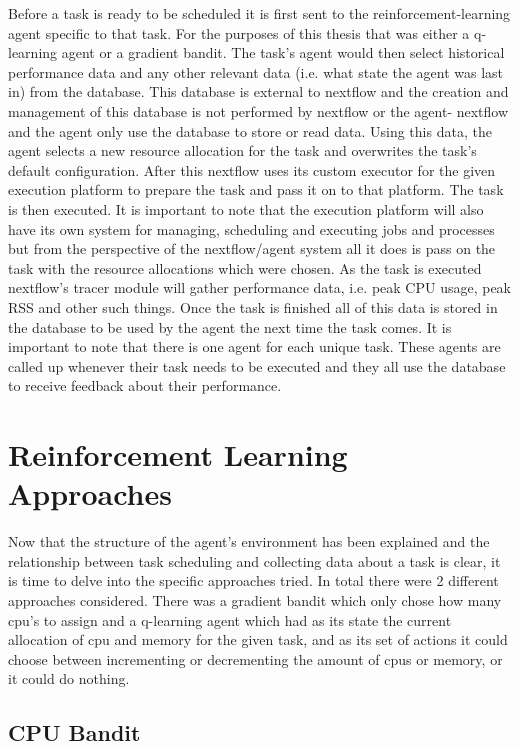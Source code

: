 Before a task is ready to be scheduled it is first sent to the reinforcement-learning agent specific to that task. For the purposes of this thesis that was either a q-learning agent or a gradient bandit. The task’s agent would then select historical performance data and any other relevant data (i.e. what state the agent was last in) from the database. This database is external to nextflow and the creation and management of this database is not performed by nextflow or the agent- nextflow and the agent only use the database to store or read data. Using this data, the agent selects a new resource allocation for the task and overwrites the task’s default configuration. After this nextflow uses its custom executor for the given execution platform to prepare the task and pass it on to that platform. The task is then executed. It is important to note that the execution platform will also have its own system for managing, scheduling and executing jobs and processes but from the perspective of the nextflow/agent system all it does is pass on the task with the resource allocations which were chosen. As the task is executed nextflow’s tracer module will \cite{TracingAndVisualisation} gather performance data, i.e. peak CPU usage, peak RSS and other such things. Once the task is finished all of this data is stored in the  database to be used by the agent the next time the task comes. It is important to note that there is one agent for each unique task. These agents are called up whenever their task needs to be executed and they all use the database to receive feedback about their performance.

\section{Reinforcement Learning Approaches}
\label{sec:rl_approaches}

Now that the structure of the agent’s environment has been explained and the relationship between task scheduling and collecting data about a task is clear, it is time to delve into the specific approaches tried. In total there were 2 different approaches considered. There was a gradient bandit which only chose how many cpu’s to assign and a q-learning agent which had as its state the current allocation of cpu and memory for the given task, and as its set of actions it could choose between incrementing or decrementing the amount of cpus or memory, or it could do nothing.

\subsection{CPU Bandit}
\label{sub:cpu_bandit}

